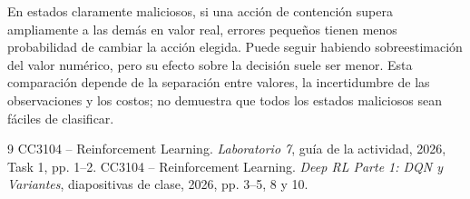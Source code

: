 \documentclass[11pt,a4paper]{article}
\begin{document}
En estados claramente maliciosos, si una acción de contención supera ampliamente a las demás en valor real, errores pequeños tienen menos probabilidad de cambiar la acción elegida. Puede seguir habiendo sobreestimación del valor numérico, pero su efecto sobre la decisión suele ser menor. Esta comparación depende de la separación entre valores, la incertidumbre de las observaciones y los costos; no demuestra que todos los estados maliciosos sean fáciles de clasificar.

\begin{thebibliography}{9}
 CC3104 -- Reinforcement Learning. \emph{Laboratorio 7}, guía de la actividad, 2026, Task 1, pp. 1--2.
 CC3104 -- Reinforcement Learning. \emph{Deep RL Parte 1: DQN y Variantes}, diapositivas de clase, 2026, pp. 3--5, 8 y 10.
\end{thebibliography}
\end{document}
